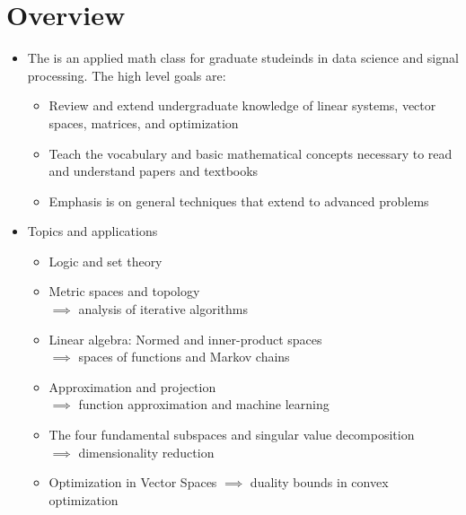 \documentclass[11pt,twoside]{report}
\begin{document}





\section{Overview} 

\begin{itemize}
\item The is an applied math class for graduate studeinds in data science and signal processing. The high level goals are: 
\begin{itemize}
  \item Review and extend undergraduate knowledge  of  linear systems, vector spaces, matrices, and optimization
  
  \item  Teach the vocabulary and basic mathematical concepts necessary to read and understand papers and textbooks
  
  \item Emphasis is on general techniques that extend to advanced problems
   


\end{itemize}

\item Topics and applications




\begin{itemize}
  \item Logic and set theory
  \item Metric spaces and topology\\  $\implies $ analysis of iterative algorithms

  \item Linear algebra: Normed and inner-product spaces\\
  $\implies $  spaces of functions and Markov chains
  \item Approximation and projection\\
   $\implies $   function approximation and machine learning    
  \item The four fundamental subspaces and singular value decomposition\\
   $\implies $  dimensionality reduction
  \item Optimization in Vector Spaces
  $\implies $  duality bounds in convex optimization
\end{itemize}


\end{itemize}
\end{document}
